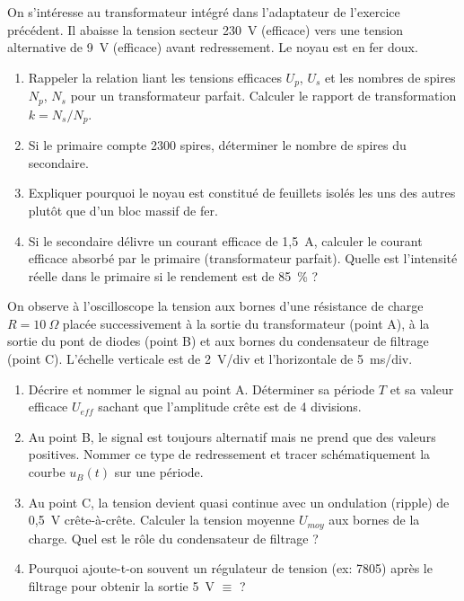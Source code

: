 \documentclass[11pt]{article}
\begin{document}
\begin{exercice}
On s'intéresse au transformateur intégré dans l'adaptateur de l'exercice précédent. Il abaisse la tension secteur 230~V (efficace) vers une tension alternative de 9~V (efficace) avant redressement. Le noyau est en fer doux.
\begin{enumerate}
    \item Rappeler la relation liant les tensions efficaces $U_p$, $U_s$ et les nombres de spires $N_p$, $N_s$ pour un transformateur parfait. Calculer le rapport de transformation $k = N_s/N_p$.
    \item Si le primaire compte 2300 spires, déterminer le nombre de spires du secondaire.
    \item Expliquer pourquoi le noyau est constitué de feuillets isolés les uns des autres plutôt que d'un bloc massif de fer.
    \item Si le secondaire délivre un courant efficace de 1,5~A, calculer le courant efficace absorbé par le primaire (transformateur parfait). Quelle est l'intensité réelle dans le primaire si le rendement est de 85~\% ?
\end{enumerate}
\end{exercice}

\begin{exercice}
On observe à l'oscilloscope la tension aux bornes d'une résistance de charge $R = 10~\Omega$ placée successivement à la sortie du transformateur (point A), à la sortie du pont de diodes (point B) et aux bornes du condensateur de filtrage (point C). L'échelle verticale est de 2~V/div et l'horizontale de 5~ms/div.
\begin{enumerate}
    \item Décrire et nommer le signal au point A. Déterminer sa période $T$ et sa valeur efficace $U_{eff}$ sachant que l'amplitude crête est de 4 divisions.
    \item Au point B, le signal est toujours alternatif mais ne prend que des valeurs positives. Nommer ce type de redressement et tracer schématiquement la courbe $u_B(t)$ sur une période.
    \item Au point C, la tension devient quasi continue avec un ondulation (ripple) de 0,5~V crête-à-crête. Calculer la tension moyenne $U_{moy}$ aux bornes de la charge. Quel est le rôle du condensateur de filtrage ?
    \item Pourquoi ajoute-t-on souvent un régulateur de tension (ex: 7805) après le filtrage pour obtenir la sortie 5~V $\equiv$ ?
\end{enumerate}
\end{exercice}
\end{document}
